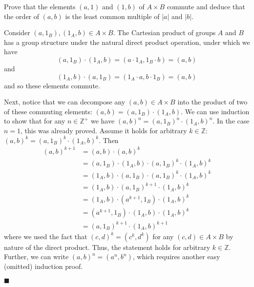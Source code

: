 \documentclass[12pt]{article}
\renewcommand{\qed}{\hfill$\blacksquare$}
\renewenvironment{proof}{\begin{addmargin}[1em]{0em}\begin{newproof}}{\end{newproof}\end{addmargin}\qed}
\newenvironment{problem}[2][Exercise]{\begin{trivlist}
\item[\hskip \labelsep {\bfseries #1}\hskip \labelsep {\bfseries #2.}]}{\end{trivlist}}
\begin{document}
\begin{problem}{1.1.30}
Prove that the elements $\left(a,1\right)$ and $\left(1,b\right)$ of $A\times B$ commute and deduce that the order of $\left(a,b\right)$ is the least common multiple of $\left|a\right|$ and $\left|b\right|$.
\end{problem}
\begin{proof}
Consider $\left(a,1_B\right), \left(1_A,b\right) \in A\times B$. The Cartesian product of groups $A$ and $B$ has a group structure under the natural direct product operation, under which we have
$$ \left(a,1_B\right)\cdot \left(1_A,b\right) = \left(a\cdot 1_A, 1_B\cdot b\right) = \left(a,b\right) $$
and
$$ \left(1_A,b\right)\cdot \left(a,1_B\right) = \left(1_A \cdot a, b\cdot 1_B\right) = \left(a,b\right) $$
and so these elements commute.

Next, notice that we can decompose any $\left(a,b\right)\in A\times B$ into the product of two of these commuting elements: $\left(a,b\right) = \left(a,1_B\right)\cdot \left(1_A,b\right)$. We can use induction to show that for any $n\in\mathbb{Z}^+$ we have $\left(a,b\right)^n = \left(a,1_B\right)^n \cdot \left(1_A,b\right)^n$. In the case $n=1$, this was already proved. Assume it holds for arbitrary $k\in \mathbb{Z}$: $\left(a,b\right)^k = \left(a,1_B\right)^k \cdot \left(1_A,b\right)^k$. Then
\begin{equation*}
    \begin{split}
        \left(a,b\right)^{k+1} & = \left(a,b\right)\cdot \left(a,b\right)^k \\
        & = \left(a,1_B\right)\cdot \left(1_A,b\right)\cdot \left(a,1_B\right)^k \cdot \left(1_A,b\right)^k \\
        & = \left(1_A,b\right)\cdot\left(a,1_B\right)\cdot  \left(a,1_B\right)^k \cdot \left(1_A,b\right)^k \\
        & = \left(1_A,b\right)\cdot \left(a,1_B\right)^{k+1} \cdot \left(1_A,b\right)^k \\
        & = \left(1_A,b\right)\cdot \left(a^{k+1},1_B\right) \cdot \left(1_A,b\right)^k \\
        & = \left(a^{k+1},1_B\right)\cdot \left(1_A,b\right)\cdot \left(1_A,b\right)^k \\
        & = \left(a,1_B\right)^{k+1}\cdot \left(1_A,b\right)^{k+1}
    \end{split}
\end{equation*}
where we used the fact that $\left(c,d\right)^k = \left(c^k,d^k\right)$ for any $\left(c,d\right)\in A\times B$ by nature of the direct product. Thus, the statement holds for arbitrary $k\in \mathbb{Z}$. Further, we can write $\left(a,b\right)^n = \left(a^n,b^n\right)$, which requires another easy (omitted) induction proof.


\end{proof}
\end{document}
